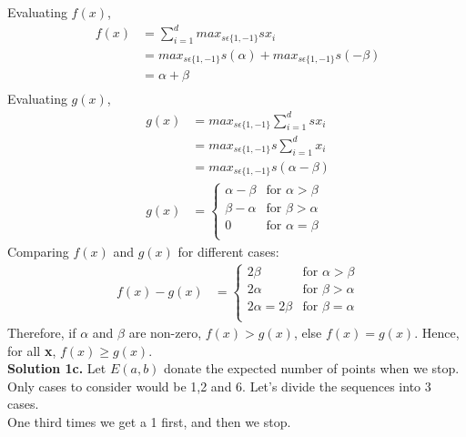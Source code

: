 \documentclass[11pt]{article}
\begin{document}
Evaluating $f(x)$,
\begin{equation*}\
\begin{split}
f(x) & = \sum_{i=1}^{d} max_{s\epsilon\{1,-1\}} sx_i \\
& =  max_{s\epsilon\{1,-1\}} s(\alpha) + max_{s\epsilon\{1,-1\}} s(-\beta)\\
& =  \alpha + \beta\\
\end{split}
\end{equation*}
\linebreak
Evaluating $g(x)$,
\begin{equation*}\
\begin{split}
g(x) & = max_{s\epsilon\{1,-1\}}\sum_{i=1}^{d} sx_i \\
& = max_{s\epsilon\{1,-1\}}s\sum_{i=1}^{d} x_i \\
& = max_{s\epsilon\{1,-1\}}s(\alpha - \beta)\\
g(x) & = \begin{cases}
\alpha - \beta & \text{for } \alpha > \beta \\
\beta - \alpha & \text{for } \beta > \alpha \\
0 & \text{for } \alpha = \beta \\
\end{cases}
\end{split}
\end{equation*}
Comparing $f(x)$ and $g(x)$ for different cases:
\begin{equation*}\
\begin{split}
f(x) - g(x) & = \begin{cases}
2\beta & \text{for } \alpha > \beta \\
2\alpha & \text{for } \beta > \alpha \\
2\alpha = 2\beta & \text{for } \beta = \alpha \\
\end{cases}
\end{split}
\end{equation*}
Therefore, if $\alpha$ and $\beta$ are non-zero, $f(x) > g(x)$, else $f(x) = g(x)$. Hence, for all \textbf{x}, $f(x) \geq g(x)$. \\
\linebreak
\textbf{Solution 1c.} Let $E(a, b)$ donate the expected number of points when we stop. Only cases to consider would be 1,2 and 6. Let's divide the sequences into 3 cases. \\
One third times we get a 1 first, and then we stop. \\
\end{document}
